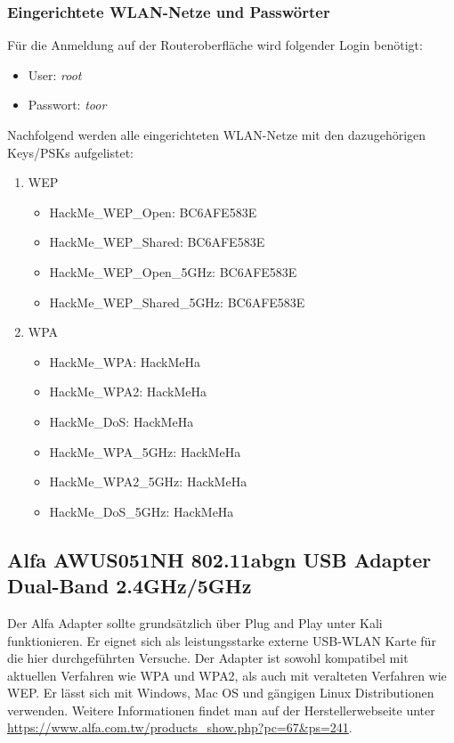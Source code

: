 \subsubsection{Eingerichtete WLAN-Netze und Passwörter}
Für die Anmeldung auf der Routeroberfläche wird folgender Login benötigt:
\begin{itemize}
	\item User: \textit{root}
	\item Passwort: \textit{toor}
\end{itemize}
Nachfolgend werden alle eingerichteten WLAN-Netze mit den dazugehörigen Keys/PSKs aufgelistet:
\begin{enumerate}
	\item {WEP}
	\begin{itemize}
			\item HackMe\_WEP\_Open: BC6AFE583E
			\item HackMe\_WEP\_Shared: BC6AFE583E
			\item HackMe\_WEP\_Open\_5GHz: BC6AFE583E
			\item HackMe\_WEP\_Shared\_5GHz: BC6AFE583E
	\end{itemize}
	\item {WPA}
	\begin{itemize}
		\item HackMe\_WPA: HackMeHa
		\item HackMe\_WPA2: HackMeHa
		\item HackMe\_DoS: HackMeHa
		\item HackMe\_WPA\_5GHz: HackMeHa
		\item HackMe\_WPA2\_5GHz: HackMeHa
		\item HackMe\_DoS\_5GHz: HackMeHa
	\end{itemize}
\end{enumerate}

\subsection{Alfa AWUS051NH 802.11abgn USB Adapter Dual-Band 2.4GHz/5GHz}

Der Alfa Adapter sollte grundsätzlich über Plug and Play unter Kali funktionieren. Er eignet sich als leistungsstarke externe USB-WLAN Karte für die hier durchgeführten Versuche. Der Adapter ist sowohl kompatibel mit aktuellen Verfahren wie WPA und WPA2, als auch mit veralteten Verfahren wie WEP. Er lässt sich mit Windows, Mac OS und gängigen Linux Distributionen verwenden.
Weitere Informationen findet man auf der Herstellerwebseite unter \url{https://www.alfa.com.tw/products_show.php?pc=67&ps=241}.

